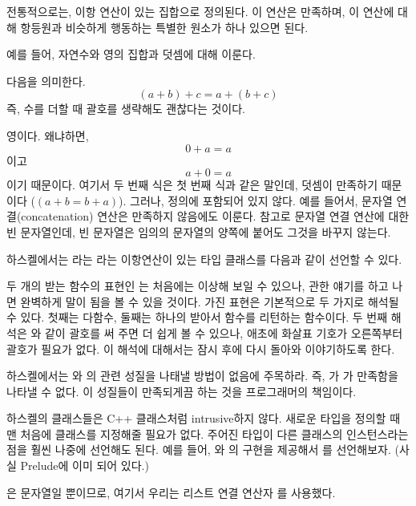 전통적으로는, \trMonoid\는 이항 연산이 있는 집합으로 정의된다. 이 연산은 \trAssociativity\를 만족하며, 
이 연산에 대해 항등원과 비슷하게 행동하는 특별한 원소가 하나 있으면 된다.

예를 들어, 자연수와 영의 집합과 덧셈에 대해 \trMonoid\를 이룬다.

 다음을 의미한다.
\[(a + b) + c = a + (b + c)\]
즉, 수를 더할 때 괄호를 생략해도 괜찮다는 것이다.

\trNeutralElement\는 영이다. 왜냐하면,
\[0 + a = a\]
이고
\[a + 0 = a\]
이기 때문이다. 여기서 두 번째 식은 첫 번째 식과 같은 말인데, 덧셈이 \trCommutativity\를 만족하기 때문이다 ($(a + b
= b + a)$).
그러나, \trCommutativity\은  정의에 포함되어 있지 않다.
예를 들어서, 문자열 연결(concatenation) 연산은 \trCommutativity\를 만족하지 않음에도 \trMonoid\를 이룬다.
참고로 문자열 연결 연산에 대한 \trNeutralElement\는 빈 문자열인데, 빈 문자열은 임의의 문자열의 양쪽에 붙어도 그것을 바꾸지 않는다.

하스켈에서는 라는 \trNeutralElement\와 라는 이항연산이 있는 \trMonoid 타입 클래스를 다음과 같이 선언할 수 있다. 

두 개의 \trArgument\를 받는 함수의 표현인
는 처음에는 이상해 보일 수 있으나,
 관한 얘기를 하고 나면 완벽하게 말이 됨을 볼 수 있을 것이다. 
\trArrow\를 가진 표현은 기본적으로 두 가지로 해석될 수 있다. 첫째는 다\trArgument 함수, 
둘째는 하나의 \trArgument\를 받아서 함수를 리턴하는 함수이다. 
두 번째 해석은 와 같이 괄호를 써 주면 더 쉽게 볼 수 있으나, 
애초에 화살표 기호가 오른쪽부터  괄호가 필요가 없다.
이 해석에 대해서는 잠시 후에 다시 돌아와 이야기하도록 한다.

하스켈에서는 와 의 \trMonoid 관련 성질을 나태낼 방법이 없음에 주목하라.
즉, 가  가 \trAssociativity\을 만족함을 나타낼 수 없다.
이 성질들이 만족되게끔 하는 것을 프로그래머의 책임이다.

하스켈의 클래스들은 C++ 클래스처럼 intrusive하지 않다.
새로운 타입을 정의할 때 맨 처음에 클래스를 지정해줄 필요가 없다. 
주어진 타입이 다른 클래스의 인스턴스라는 점을 훨씬 나중에 선언해도 된다.
예를 들어, 와 의 구현을 제공해서 를 \trMonoid\로 선언해보자.
(사실 Prelude에 이미 되어 있다.)

은 문자열일 뿐이므로, 여기서 우리는 리스트 연결 연산자 \code{(++)}를 사용했다.


